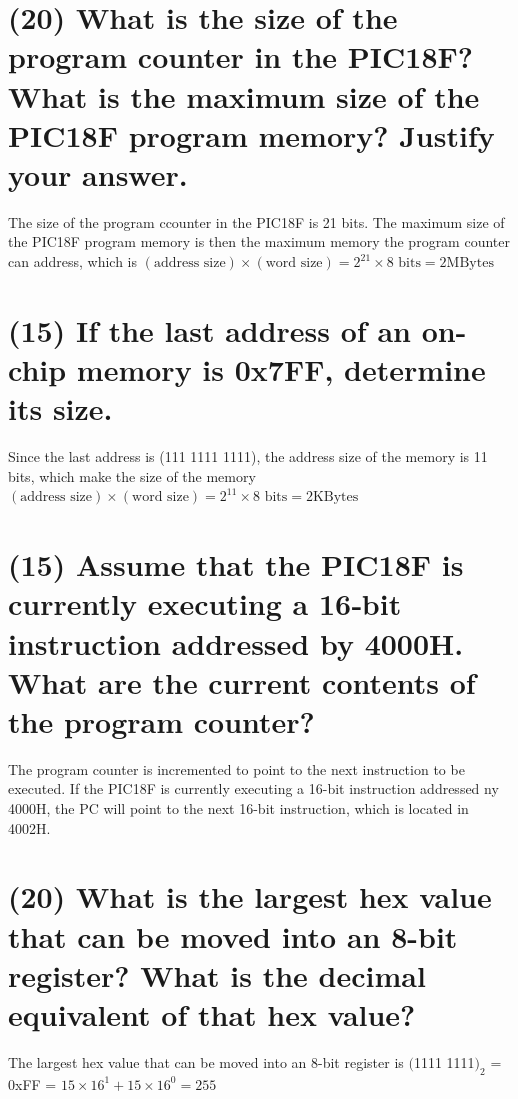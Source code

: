 \documentclass{article}
\begin{document}



\section{(20) What is the size of the program counter in the PIC18F? What is the maximum size of the PIC18F program memory? Justify your answer.}
The size of the program ccounter in the PIC18F is 21 bits. The maximum size of the PIC18F program memory is then the maximum memory the program counter can address, which is $(\text{address size})\times(\text{word size})=2^{21}\times 8\text{ bits} = 2\text{MBytes}$

\newpage

\section{(15) If the last address of an on-chip memory is 0x7FF, determine its size.}
Since the last address is (111 1111 1111), the address size of the memory is 11 bits, which make the size of the memory $(\text{address size})\times(\text{word size})=2^{11}\times 8\text{ bits} = 2\text{KBytes}$


\newpage

\section{(15) Assume that the PIC18F is currently executing a 16‐bit instruction addressed by 4000H. What are the current contents of the program counter?}
The program counter is incremented to point to the next instruction to be executed. If the PIC18F is currently executing a 16-bit instruction addressed ny 4000H, the PC will point to the next 16-bit instruction, which is located in 4002H.
\newpage

\section{(20) What is the largest hex value that can be moved into an 8-bit register? What is the decimal equivalent of that hex value?}
The largest hex value that can be moved into an 8-bit register is $($1111 1111$)_2$ = 0xFF = $15\times16^1 + 15\times16^0=255$
\newpage
\end{document}
